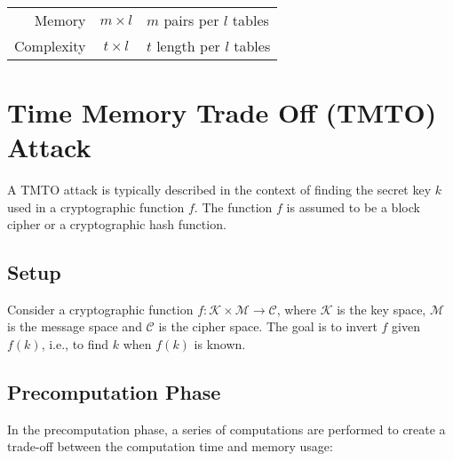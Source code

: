 \begin{note}
\ \begin{table}[h!]\centering
\begin{tabular}{@{\extracolsep{\fill}}rcl}
	Memory & $m\times l$ & $m$ pairs per $l$ tables \\
	Complexity & $t\times l$ & $t$ length per $l$ tables
\end{tabular}
\end{table}
\begin{center}
\end{center}
\end{note}

\section{Time Memory Trade Off (TMTO) Attack}
A TMTO attack is typically described in the context of finding the secret key $k$ used in a cryptographic function $f$. The function $f$ is assumed to be a block cipher or a cryptographic hash function.

\subsection*{Setup}
Consider a cryptographic function $f: \mathcal{K}\times\mathcal{M} \rightarrow \mathcal{C}$, where $\mathcal{K}$ is the key space, $\mathcal{M}$ is the message space and $\mathcal{C}$ is the cipher space. The goal is to invert $f$ given $f(k)$, i.e., to find $k$ when $f(k)$ is known. 

\subsection*{Precomputation Phase}
In the precomputation phase, a series of computations are performed to create a trade-off between the computation time and memory usage:


